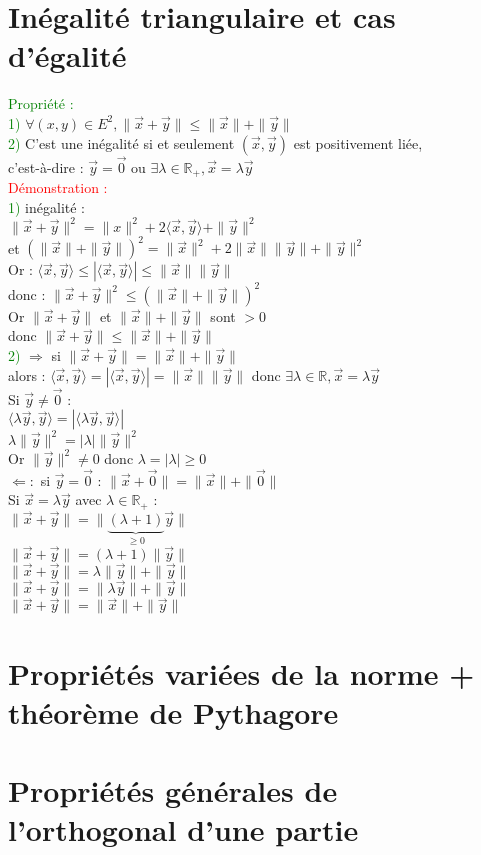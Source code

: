 \documentclass{article}
\begin{document}
\section{Inégalité triangulaire et cas d'égalité}
\textcolor{green}{Propriété :} \\
\textcolor{green}{1)} $\forall (x,y) \in E^2, \| \vec x + \vec y \| \leq \| \vec x \| + \| \vec y \|$ \\
\textcolor{green}{2)} C'est une inégalité si et seulement $(\vec x, \vec y)$ est positivement liée, \\
c'est-à-dire : $\vec y =\vec 0$ ou $\exists \lambda \in \mathbb R_+, \vec x= \lambda \vec y$ \\
\textcolor{red}{Démonstration :} \\
\textcolor{green}{1)} inégalité : \\
$\| \vec x + \vec y \|^2= \|x \|^2+ 2 \langle \vec x, \vec y \rangle + \| \vec y \|^2 $ \\
et $(\| \vec x \| + \| \vec y \|)^2= \| \vec x \|^2 + 2 \| \vec x \| \| \vec y \| + \| \vec y \|^2$ \\
Or : $\langle \vec x, \vec y \rangle \leq | \langle \vec x , \vec y \rangle | \leq \| \vec x \| \| \vec y \|$ \\
donc : $\| \vec x + \vec y \|^2\leq (\| \vec x \| + \| \vec y \|)^2$ \\
Or $\| \vec x + \vec y \|$ et $\| \vec x \| + \| \vec y \|$ sont $>0$ \\
donc $\| \vec x +\vec y \| \leq \| \vec x \| + \| \vec y \|$ \\
\textcolor{green}{2)} $\Rightarrow$ si $\| \vec x + \vec y \|= \| \vec x \| + \| \vec y \|$ \\
alors : $\langle \vec x, \vec y \rangle = | \langle \vec x, \vec y \rangle |= \| \vec x \| \| \vec y \|$
donc $\exists \lambda \in \mathbb R ,\vec x = \lambda \vec y$ \\
Si $\vec y \neq \vec 0$ : \\
$\langle \lambda \vec y, \vec y \rangle = | \langle \lambda \vec y,\vec y \rangle |$ \\
$\lambda \| \vec y \|^2= |\lambda| \| \vec y \|^2$ \\
Or $\| \vec y \|^2 \neq 0$ donc $\lambda=|\lambda|\geq 0$ \\
$\Leftarrow :$ si $\vec y= \vec 0$ : $\|\vec x + \vec 0 \|= \| \vec x \| + \| \vec 0 \|$ \\
Si $\vec x = \lambda \vec y$ avec $\lambda \in \mathbb R_+$ : \\
$\| \vec x + \vec y \| = \| \underbrace{(\lambda +1)}_{\geq 0} \vec y \|$ \\
$\| \vec x + \vec y \| = (\lambda + 1) \| \vec y \|$ \\
$\| \vec x + \vec y \| = \lambda \|\vec y \| + \| \vec y \|$ \\
$\| \vec x + \vec y \| = \| \lambda \vec y \| + \| \vec y \|$ \\
$\| \vec x + \vec y \| = \| \vec x \| + \| \vec y \|$
\section{Propriétés variées de la norme + théorème de Pythagore}
\section{Propriétés générales de l'orthogonal d'une partie}
\end{document}
